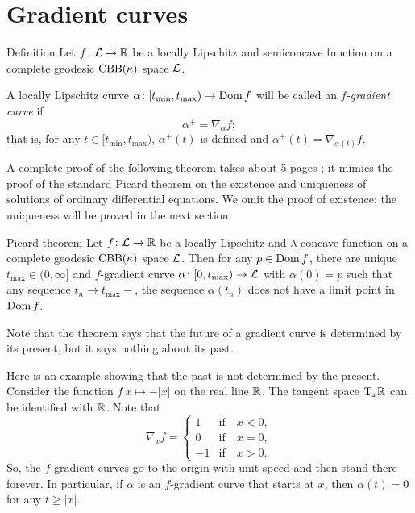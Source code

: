\section{Gradient curves}

\begin{thm}{Definition}\label{def:grad-curve}
Let $f\colon\mathcal{L}\to\mathbb{R}$ be a locally Lipschitz and semiconcave function on a complete geodesic $\mathrm{CBB}(\kappa)$ space
$\mathcal{L}$.

A locally Lipschitz curve $\alpha\colon[t_{\min},t_{\max})\to\mathop{\rm Dom}\nolimits f$ will be called an \emph{$f$-gradient curve} if
\[\alpha^+=\nabla_{\alpha} f;\]
that is, for any $t\in[t_{\min},t_{\max})$, $\alpha^+(t)$ is defined and 
$\alpha^+(t)=\nabla_{\alpha(t)} f$.
\end{thm}

A complete proof of the following theorem takes about 5 pages \cite{alexander-kapovitch-petrunin2024}; 
it mimics the proof of the standard Picard theorem on the existence and uniqueness of solutions of ordinary differential equations.
We omit the proof of existence;
the uniqueness will be proved in the next section.


\begin{thm}{Picard theorem}\label{thm:glob-exist-grad-curv}
Let $f\colon\mathcal{L}\to \mathbb{R}$ be a locally Lipschitz and $\lambda$-concave function on a complete geodesic $\mathrm{CBB}(\kappa)$ space $\mathcal{L}$.
Then for any $p\in \mathop{\rm Dom}\nolimits f$, there are unique $t_{\max}\in(0,\infty]$ and $f$-gradient curve $\alpha\colon[0,t_{\max})\to \mathcal{L}$ with $\alpha(0)=p$ such that any sequence $t_n\to t_{\max}-$, the sequence $\alpha(t_n)$ does not have a limit point in $\mathop{\rm Dom}\nolimits f$.
\end{thm}

Note that the theorem says that the future of a gradient curve is determined by its present, but it says nothing about its past.

Here is an example showing that the past is not determined by the present.
Consider the function $f\:x\mapsto -|x|$ on the real line $\mathbb{R}$.
The tangent space $\mathrm{T}_x\mathbb{R}$ can be identified with $\mathbb{R}$.
Note that 
\[\nabla_xf=
\begin{cases}
1&\text{if}\quad x<0,
\\
0&\text{if}\quad x=0,
\\
-1&\text{if}\quad x>0.
\end{cases}
\]
So, the $f$-gradient curves go to the origin with unit speed and then stand there forever.
In particular, if $\alpha$ is an $f$-gradient curve that starts at $x$,
then $\alpha(t)=0$ for any $t\ge |x|$.

